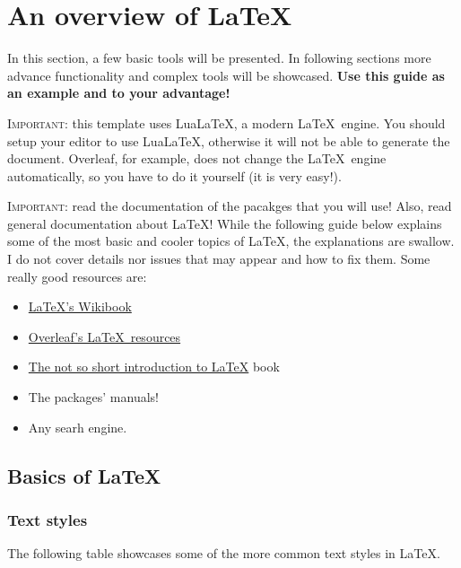 \chapter{An overview of \LaTeX}

In this section, a few basic tools will be presented. In following sections more advance functionality and complex tools will be showcased. \textbf{Use this guide as an example and to your advantage!}

\textsc{\color{red}Important:} this template uses Lua\LaTeX, a modern \LaTeX\ engine. You should setup your editor to use Lua\LaTeX, otherwise it will not be able to generate the document. Overleaf, for example, does not change the \LaTeX\ engine automatically, so you have to do it yourself (it is very easy!).

\textsc{\color{red}Important:} read the documentation of the pacakges that you will use! Also, read general documentation about \LaTeX! While the following guide below explains some of the most basic and cooler topics of \LaTeX, the explanations are swallow. I do not cover details nor issues that may appear and how to fix them. Some really good resources are:
\begin{itemize}
	\item \href{https://en.wikibooks.org/wiki/LaTeX}{\LaTeX's Wikibook}
	\item \href{https://www.overleaf.com/learn}{Overleaf's \LaTeX\ resources}
	\item \href{https://www.ctan.org/tex-archive/info/lshort/english/}{The not so short introduction to \LaTeX} book
	\item {\color{red} The packages' manuals!}
	\item Any searh engine.
\end{itemize}

\section{Basics of \LaTeX}

\subsection{Text styles}

The following table showcases some of the more common text styles in \LaTeX.

